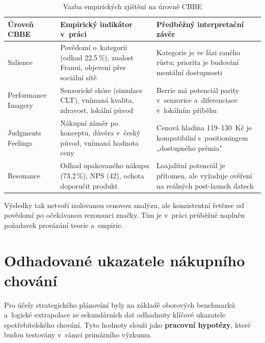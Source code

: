 \begin{table}[H]
\centering
\caption{Vazba empirických zjištění na úrovně CBBE}
\label{tab:cbbe_results_link}
\begin{tabularx}{\textwidth}{l>{\raggedright\arraybackslash}X>{\raggedright\arraybackslash}X}
\toprule
\textbf{Úroveň CBBE} & \textbf{Empirický indikátor v~práci} & \textbf{Předběžný interpretační závěr} \\
\midrule
Salience & Povědomí o~kategorii (odhad 22,5\,\%), znalost Franui, objevení přes sociální sítě & Kategorie je ve fázi raného růstu; priorita je budování mentální dostupnosti \\
Performance \/ Imagery & Senzorické skóre (simulace CLT), vnímaná kvalita, zdravost, lokální původ & Berrie má potenciál parity v~senzorice a~diferenciace v~lokálním příběhu \\
Judgments \/ Feelings & Nákupní záměr po konceptu, důvěra v~český původ, vnímaná hodnota ceny & Cenová hladina 119--130~Kč je kompatibilní s~positioningem „dostupného prémia" \\
Resonance & Odhad opakovaného nákupu (73,2\,\%), NPS (42), ochota doporučit produkt & Loajalitní potenciál je přítomen, ale vyžaduje ověření na reálných post-launch datech \\
\bottomrule
\end{tabularx}
\end{table}

Výsledky tak netvoří izolovanou cenovou analýzu, ale konzistentní řetězec od povědomí po očekávanou rezonanci značky. Tím je v~práci průběžně naplněn požadavek provázání teorie a~empirie.

\section{Odhadované ukazatele nákupního chování}
\label{sec:res_estimated_indicators}

Pro účely strategického plánování byly na základě oborových benchmarků a~logické extrapolace ze sekundárních dat odhadnuty klíčové ukazatele spotřebitelského chování. Tyto hodnoty slouží jako \textbf{pracovní hypotézy}, které budou testovány v~rámci primárního výzkumu.

